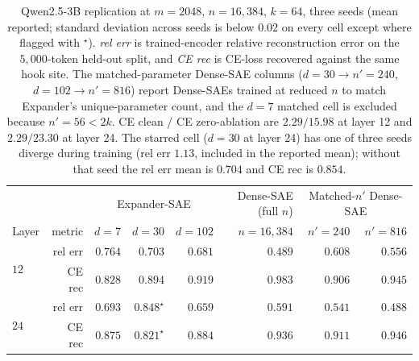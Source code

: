 \documentclass{article}
\theoremstyle{plain}
\theoremstyle{definition}
\theoremstyle{remark}
\begin{document}
\begin{table}[h]
    \centering
    \caption{Qwen2.5-3B replication at $m{=}2048$, $n{=}16{,}384$, $k{=}64$, three seeds (mean reported; standard deviation across seeds is below $0.02$ on every cell except where flagged with $^\star$). \emph{rel err} is trained-encoder relative reconstruction error on the $5{,}000$-token held-out split, and \emph{CE rec} is CE-loss recovered against the same hook site. The matched-parameter Dense-SAE columns ($d{=}30 \to n'{=}240$, $d{=}102 \to n'{=}816$) report Dense-SAEs trained at reduced $n$ to match Expander's unique-parameter count, and the $d{=}7$ matched cell is excluded because $n'{=}56 < 2k$. CE clean / CE zero-ablation are $2.29/15.98$ at layer 12 and $2.29/23.30$ at layer 24. The starred cell ($d{=}30$ at layer 24) has one of three seeds diverge during training (rel err $1.13$, included in the reported mean); without that seed the rel err mean is $0.704$ and CE rec is $0.854$.}
    \label{tab:bench_qwen2_5_3b}
    \small
    \setlength{\tabcolsep}{4pt}
    \begin{tabular}{lrrrrrrr}
        \toprule
        & & \multicolumn{3}{c}{Expander-SAE} & \shortstack{Dense-SAE\\(full $n$)} & \multicolumn{2}{c}{Matched-$n'$ Dense-SAE} \\
        \cmidrule(lr){3-5}\cmidrule(lr){7-8}
        Layer & metric & $d{=}7$ & $d{=}30$ & $d{=}102$ & $n{=}16{,}384$ & $n'{=}240$ & $n'{=}816$ \\
        \midrule
        \multirow{2}{*}{$12$} & rel err & $0.764$ & $0.703$ & $0.681$ & $0.489$ & $0.608$ & $0.556$ \\
                              & CE rec  & $0.828$ & $0.894$ & $0.919$ & $0.983$ & $0.906$ & $0.945$ \\
        \midrule
        \multirow{2}{*}{$24$} & rel err & $0.693$ & $0.848^\star$ & $0.659$ & $0.591$ & $0.541$ & $0.488$ \\
                              & CE rec  & $0.875$ & $0.821^\star$ & $0.884$ & $0.936$ & $0.911$ & $0.946$ \\
        \bottomrule
    \end{tabular}
\end{table}
\end{document}
